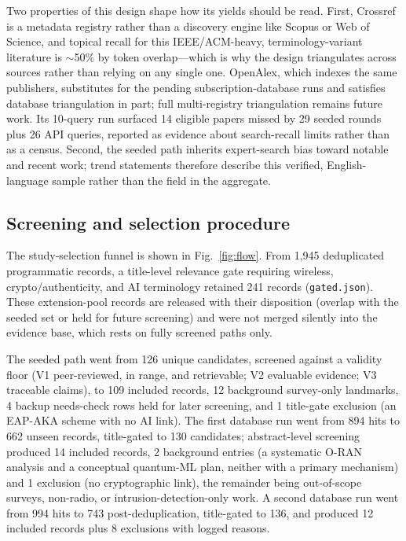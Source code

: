 Two properties of this design shape how its yields should be read. First, Crossref is a metadata registry rather than a discovery engine like Scopus or Web of Science, and topical recall for this IEEE/ACM-heavy, terminology-variant literature is $\sim$50\% by token overlap---which is why the design triangulates across sources rather than relying on any single one. OpenAlex, which indexes the same publishers, substitutes for the pending subscription-database runs and satisfies database triangulation in part; full multi-registry triangulation remains future work. Its 10-query run surfaced 14 eligible papers missed by 29 seeded rounds plus 26 API queries, reported as evidence about search-recall limits rather than as a census. Second, the seeded path inherits expert-search bias toward notable and recent work; trend statements therefore describe this verified, English-language sample rather than the field in the aggregate.

\subsection{Screening and selection procedure}
The study-selection funnel is shown in Fig.~\ref{fig:flow}. From 1,945 deduplicated programmatic records, a title-level relevance gate requiring wireless, crypto/authenticity, and AI terminology retained 241 records (\texttt{gated.json}). These extension-pool records are released with their disposition (overlap with the seeded set or held for future screening) and were not merged silently into the evidence base, which rests on fully screened paths only.

The seeded path went from 126 unique candidates, screened against a validity floor (V1 peer-reviewed, in range, and retrievable; V2 evaluable evidence; V3 traceable claims), to 109 included records, 12 background survey-only landmarks, 4 backup needs-check rows held for later screening, and 1 title-gate exclusion (an EAP-AKA scheme with no AI link). The first database run went from 894 hits to 662 unseen records, title-gated to 130 candidates; abstract-level screening produced 14 included records, 2 background entries (a systematic O-RAN analysis and a conceptual quantum-ML plan, neither with a primary mechanism) and 1 exclusion (no cryptographic link), the remainder being out-of-scope surveys, non-radio, or intrusion-detection-only work. A second database run went from 994 hits to 743 post-deduplication, title-gated to 136, and produced 12 included records plus 8 exclusions with logged reasons.

